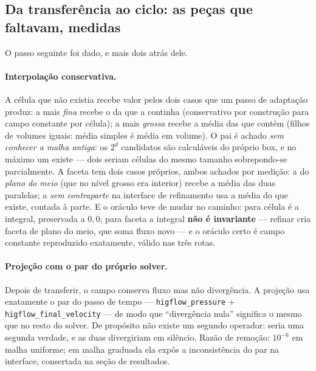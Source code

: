 \subsection{Da transferência ao ciclo: as peças que faltavam, medidas}

O passo seguinte foi dado, e mais dois atrás dele.

\paragraph{Interpolação conservativa.} A célula que não existia recebe valor
pelos dois casos que um passo de adaptação produz: a mais \emph{fina} recebe o
da que a continha (conservativo por construção para campo constante por
célula); a mais \emph{grossa} recebe a média das que contém (filhos de volumes
iguais: média simples é média em volume). O pai é achado \emph{sem conhecer a
malha antiga}: os $2^d$ candidatos são calculáveis do próprio box, e no máximo
um existe --- dois seriam células do mesmo tamanho sobrepondo-se parcialmente.
A faceta tem dois casos próprios, ambos achados por medição: a do \emph{plano
do meio} (que no nível grosso era interior) recebe a média das duas paralelas;
a \emph{sem contraparte} na interface de refinamento usa a média do que existe,
contada à parte. E o oráculo teve de mudar no caminho: para célula é a
integral, preservada a $0{,}0$; para faceta a integral \textbf{não é
invariante} --- refinar cria faceta de plano do meio, que soma fluxo novo ---
e o oráculo certo é campo constante reproduzido exatamente, válido nas três
rotas.

\paragraph{Projeção com o par do próprio solver.} Depois de transferir, o
campo conserva fluxo mas não divergência. A projeção usa exatamente o par do
passo de tempo --- \texttt{higflow\_pressure} +
\texttt{higflow\_final\_velocity} --- de modo que ``divergência nula''
significa o mesmo que no resto do solver. De propósito não existe um segundo
operador: seria uma segunda verdade, e as duas divergiriam em silêncio. Razão
de remoção: $10^{-6}$ em malha uniforme; em malha graduada ela expôs a
inconsistência do par na interface, consertada na seção de resultados.

